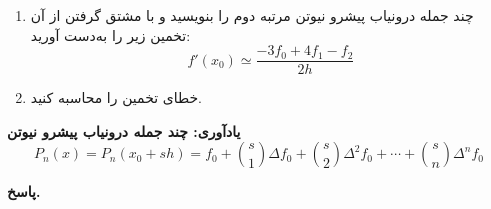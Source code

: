 \begin{enumerate}
	\item[الف)] چند جمله درونیاب پیشرو نیوتن مرتبه دوم را بنویسید و با مشتق گرفتن از آن تخمین زیر را به‌دست آورید:
	\[f'(x_0) \simeq \frac{-3f_0 + 4f_1 -f_2}{2h}\]
 		\vspace*{-.3cm}
	\item[ب)] 
	خطای تخمین را محاسبه کنید.
\end{enumerate}
\textbf{یادآوری: چند جمله درونیاب پیشرو نیوتن }
\[P_n(x) = P_n(x_0+sh) = f_0 + {s \choose 1} \Delta f_0 + {s \choose 2} \Delta^2 f_0 + \cdots + {s \choose n} \Delta^n f_0 \]
\vspace*{-.3cm}
\begin{answer}
	
	\textbf{پاسخ.}
	
\end{answer}